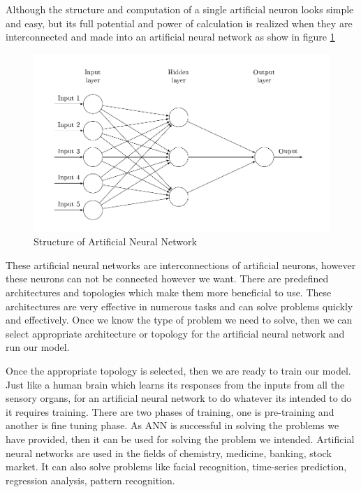 \documentclass[12pt, a4paper]{report}
\begin{document}
Although the structure and computation of a single artificial neuron looks simple and easy, but its full potential and power of calculation is realized when they are interconnected and made into an artificial neural network as show in figure \ref{fig:NN}\\ \par
\begin{figure}[h]
\centering
\includegraphics[width=12cm]{neural_network.png}
\caption{Structure of Artificial Neural Network}
\label{fig:NN}
\end{figure}

These artificial neural networks are interconnections of artificial neurons, however these neurons can not be connected however we want. There are predefined architectures and topologies which make them more beneficial to use. These architectures are very effective in numerous tasks and can solve problems quickly and effectively. Once we know the type of problem we need to solve, then we can select appropriate  architecture or topology for the artificial neural network and run our model.\\ \par

Once the appropriate topology is selected, then we are ready to train our model. Just like a human brain which learns its responses from the inputs  from all the sensory organs, for an artificial neural network to do whatever its intended to do it requires training. There are two phases of training, one is pre-training and another is fine tuning phase. As ANN is successful in solving the problems we have provided, then it can be used for solving the problem we intended. Artificial neural networks are used in the fields of chemistry, medicine, banking, stock market. It can also solve problems like facial recognition, time-series prediction, regression analysis, pattern recognition.
\end{document}
